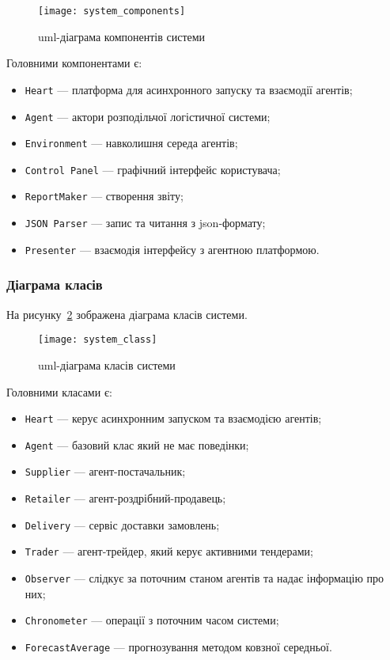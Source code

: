 \begin{figure}[H]
	\centering
	\texttt{[image: system\_components]}
	\caption{\acrshort{uml}-діаграма компонентів системи}
	\label{fig:system_component}
\end{figure} 

Головними компонентами є:
\begin{itemize}
	\item \texttt{Heart} --- платформа для асинхронного запуску та взаємодії агентів;
	\item \texttt{Agent} --- актори розподільчої логістичної системи;
	\item \texttt{Environment} --- навколишня середа агентів;
	\item \texttt{Control Panel} --- графічний інтерфейс користувача;
	\item \texttt{ReportMaker} --- створення звіту;
	\item \texttt{JSON Parser} --- запис та читання з \acrshort{json}-формату;
	\item \texttt{Presenter} --- взаємодія інтерфейсу з агентною платформою.
\end{itemize}

\subsubsection{Діаграма класів}
На рисунку~\ref{fig:system_class} зображена діаграма класів системи.

\begin{figure}[H]
	\centering
	\texttt{[image: system\_class]}
	\caption{\acrshort{uml}-діаграма класів системи}
	\label{fig:system_class}
\end{figure} 

Головними класами є:
\begin{itemize}
	\item \texttt{Heart} --- керує асинхронним запуском та взаємодією агентів;
	\item \texttt{Agent} --- базовий клас який не має поведінки;
	\item \texttt{Supplier} --- агент-постачальник;
	\item \texttt{Retailer} --- агент-роздрібний-продавець;
	\item \texttt{Delivery} --- сервіс доставки замовлень;
	\item \texttt{Trader} --- агент-трейдер, який керує активними тендерами;
	\item \texttt{Observer} --- слідкує за поточним станом агентів та надає інформацію про них;
	\item \texttt{Chronometer} --- операції з поточним часом системи;
	\item \texttt{ForecastAverage} --- прогнозування методом ковзної середньої.
\end{itemize}

